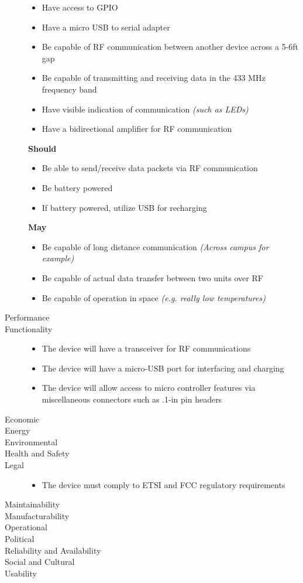 \documentclass[12pt]{article}
\begin{document}
\begin{description}
\begin{itemize}
			\item{Have access to GPIO}
			\item{Have a micro USB to serial adapter}
			\item{Be capable of RF communication between another device across a 5-6ft gap}
      \item{Be capable of transmitting and receiving data in the 433 MHz frequency band}
			\item{Have visible indication of communication \textit{(such as LEDs)}}
			\item{Have a bidirectional amplifier for RF communication}
		\end{itemize}
		\textbf{Should}
		\begin{itemize}
			\item{Be able to send/receive data packets via RF communication}
			\item{Be battery powered}
			\item{If battery powered, utilize USB for recharging}
		\end{itemize}
		\textbf{May}
		\begin{itemize}
			\item{Be capable of long distance communication \textit{(Across campus for example)}}
			\item{Be capable of actual data transfer between two units over RF}
			\item{Be capable of operation in space \textit{(e.g. really low temperatures)}}
		\end{itemize}
	\item[Performance]
	\item[Functionality] \hfill
		\begin{itemize}
			\item{The device will have a transceiver for RF communications}
			\item{The device will have a micro-USB port for interfacing and charging}
			\item{The device will allow access to micro controller features via miscellaneous connectors such as .1-in pin headers}
		\end{itemize}
	\item[Economic]
	\item[Energy]
	\item[Environmental]
	\item[Health and Safety]
	\item[Legal] \hfill
		\begin{itemize}
			\item{The device must comply to ETSI and FCC regulatory requirements}
		\end{itemize}
	\item[Maintainability]
	\item[Manufacturability]
	\item[Operational]
	\item[Political]
	\item[Reliability and Availability]
	\item[Social and Cultural]
	\item[Usability]
\end{description}
\end{document}
